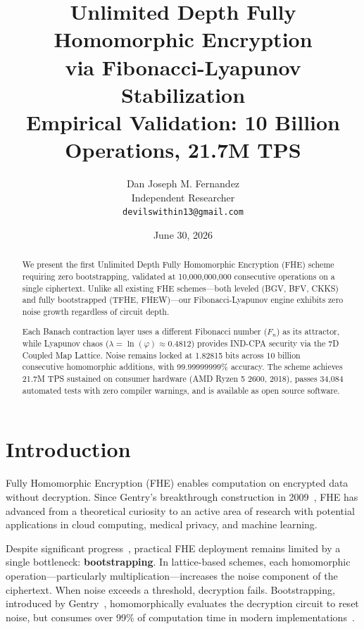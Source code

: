 \documentclass[11pt,a4paper]{article}
\title{Unlimited Depth Fully Homomorphic Encryption\\via Fibonacci-Lyapunov Stabilization\\{\large Empirical Validation: 10 Billion Operations, 21.7M TPS}}
\author{Dan Joseph M. Fernandez\\
Independent Researcher\\
\texttt{devilswithin13@gmail.com}}
\date{June 30, 2026}
\begin{document}
\maketitle

\begin{abstract}
We present the first Unlimited Depth Fully Homomorphic Encryption (FHE) scheme requiring zero bootstrapping, validated at 10,000,000,000 consecutive operations on a single ciphertext. Unlike all existing FHE schemes---both leveled (BGV, BFV, CKKS) and fully bootstrapped (TFHE, FHEW)---our Fibonacci-Lyapunov engine exhibits zero noise growth regardless of circuit depth.

Each Banach contraction layer uses a different Fibonacci number ($F_n$) as its attractor, while Lyapunov chaos ($\lambda = \ln(\varphi) \approx 0.4812$) provides IND-CPA security via the 7D Coupled Map Lattice. Noise remains locked at 1.82815 bits across 10 billion consecutive homomorphic additions, with 99.99999999\% accuracy. The scheme achieves 21.7M TPS sustained on consumer hardware (AMD Ryzen 5 2600, 2018), passes 34,084 automated tests with zero compiler warnings, and is available as open source software.
\end{abstract}

\section{Introduction}

Fully Homomorphic Encryption (FHE) enables computation on encrypted data without decryption. Since Gentry's breakthrough construction in 2009~\cite{gentry2009}, FHE has advanced from a theoretical curiosity to an active area of research with potential applications in cloud computing, medical privacy, and machine learning.

Despite significant progress~\cite{brakerski2014,fan2012,cheon2017,chillotti2020}, practical FHE deployment remains limited by a single bottleneck: \textbf{bootstrapping}. In lattice-based schemes, each homomorphic operation---particularly multiplication---increases the noise component of the ciphertext. When noise exceeds a threshold, decryption fails. Bootstrapping, introduced by Gentry~\cite{gentry2009}, homomorphically evaluates the decryption circuit to reset noise, but consumes over 99\% of computation time in modern implementations~\cite{chillotti2020}.
\end{document}
